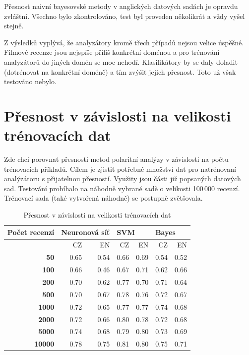 Přesnost naivní bayesovské metody v anglických datových sadách je opravdu zvláštní. Všechno bylo zkontrolováno, test byl proveden několikrát a vždy vyšel stejně. 

Z výsledků vyplývá, že analyzátory kromě třech případů nejsou velice úspěšné. Filmové recenze jsou nejspíše příliš konkrétní doménou a pro trénování analyzátorů do jiných domén se moc nehodí. Klasifikátory by se daly doladit (dotrénovat na konkrétní doméně) a tím zvýšit jejich přesnost. Toto už však testováno nebylo.  

\FloatBarrier

\section{Přesnost v závislosti na velikosti trénovacích dat}
Zde chci porovnat přesnosti metod polaritní analýzy v závislosti na počtu trénovacích příkladů. Cílem je zjistit potřebné množství dat pro natrénovaní analýzátoru s přijatelnou přesností. Využity jsou části již popsaných datových sad. Testování probíhalo na náhodně vybrané sadě o velikosti 100\,000 recenzí. Trénovací sada (také vytvořená náhodně) se postupně zvětšovala. 

\FloatBarrier
\begin{table}[h!]
  \begin{center}
    \caption{Přesnost v závislosti na velikosti trénovacích dat}
    \label{tab:table1.9}
    \begin{tabular}{r|r|r|r|r|r|r}
      \textbf{Počet recenzí} &  \multicolumn{2}{l}{\textbf{Neuronová síť}} & \multicolumn{2}{l}{\textbf{SVM}} & \multicolumn{2}{l}{\textbf{Bayes}}\\ 
      \hline
      \textbf & CZ & EN & CZ & EN & CZ & EN \\ 
      \textbf{50} & 0.65 & 0.54 & 0.66 & 0.69 & 0.54 & 0.52  \\ 
      \textbf{100} & 0.66 & 0.46 & 0.67 & 0.71 & 0.62 & 0.66 \\  
      \textbf{200} & 0.70 & 0.62 & 0.77 & 0.70 & 0.71 & 0.64 \\ 
      \textbf{500} & 0.70 & 0.67 & 0.78 & 0.76 & 0.72 & 0.67 \\ 
      \textbf{1000} & 0.72 & 0.65 & 0.77 & 0.77 & 0.74 & 0.68 \\ 
      \textbf{2000} & 0.72 & 0.66 & 0.80 & 0.78 & 0.72 & 0.68 \\ 
      \textbf{5000} & 0.74 & 0.68 & 0.79 & 0.80 & 0.73 & 0.69 \\ 
      \textbf{10000} & 0.78 & 0.75 & 0.81 & 0.80 & 0.75 & 0.71 \\ 
     \end{tabular}
  \end{center}
\end{table}
\FloatBarrier

